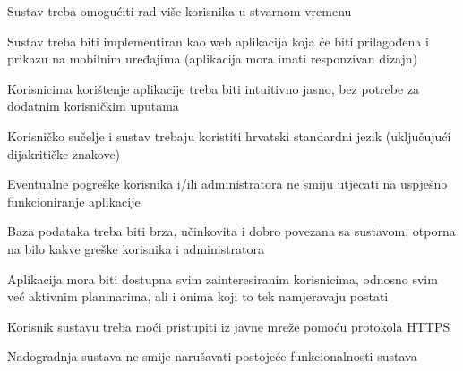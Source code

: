 		 
			 	\begin{packed_item}
			 	
			 	\item  $ $Sustav treba omogućiti rad više korisnika u stvarnom vremenu $ $
			 	\item  $ $Sustav treba biti implementiran kao web aplikacija koja će biti prilagođena i prikazu na mobilnim uređajima (aplikacija mora imati responzivan dizajn) $ $
			 	\item  $ $Korisnicima korištenje aplikacije treba biti intuitivno jasno, bez potrebe za dodatnim korisničkim uputama$ $
			 	\item  $ $Korisničko sučelje i sustav trebaju koristiti hrvatski standardni jezik (uključujući dijakritičke znakove)$ $
			 	\item  $ $Eventualne pogreške korisnika i/ili administratora ne smiju utjecati na uspješno funkcioniranje aplikacije$ $
			 	\item  $ $Baza podataka treba biti brza, učinkovita i dobro povezana sa sustavom, otporna na bilo kakve greške korisnika i administratora $ $
			 	
			 	\item  $ $Aplikacija mora biti dostupna svim zainteresiranim korisnicima, odnosno svim već aktivnim planinarima, ali i onima koji to tek namjeravaju postati$ $
			 	\item  $ $Korisnik sustavu treba moći pristupiti iz javne mreže pomoću protokola HTTPS $ $
			 	\item  $ $Nadogradnja sustava ne smije narušavati postojeće funkcionalnosti sustava$ $
			 	
			 
			 \end{packed_item}
			 
			 \eject
			 
	